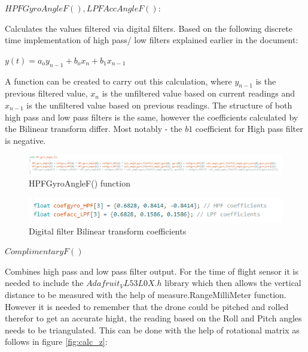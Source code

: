 $HPFGyroAngleF(), LPFAccAngleF():$\newline

Calculates the values filtered via digital filters. Based on the following discrete time implementation of high pass/ low filters explained earlier in the document:

$y(t)=a_o y_{n-1}+b_ox_n+b_1x_{n-1}  $


A function can be created to carry out this calculation, where $y_{n-1}$ is the previous filtered value, $x_n$ is the unfiltered value based on current readings and $x_{n-1}$ is the unfiltered value based on previous readings. The structure of both high pass and low pass filters is the same, however the coefficients calculated by the Bilinear transform differ. Most notably - the 
$b1$ coefficient for High pass filter is negative.

\begin{figure}[H]
    \begin{center}
    \includegraphics[scale = 0.85]{pictures/IMU/HPF_gyro.png}
    \end{center}
    \caption{HPFGyroAngleF() function}
    \label{fig:my_label}
\end{figure}

\begin{figure}[H]
    \begin{center}
    \includegraphics[scale = 0.85]{pictures/IMU/HPF_LPF_coefff.png}
    \end{center}
    \caption{Digital filter Bilinear transform coefficients}
    \label{fig:my_label}
\end{figure}


$ComplimentaryF()$
\newline

Combines high pass and low pass filter output.
For the time of flight sensor it is needed to include the $Adafruit_VL53L0X.h$ library \cite{VL53L0XV2} which then allows the vertical distance to be measured with the help of measure.RangeMilliMeter function.
However it is needed to remember that the drone could be pitched and rolled therefor to get an accurate hight, the reading based on the Roll and Pitch angles needs to be triangulated.
This can be done with the help of rotational matrix as follows in figure \ref{fig:calc_z}:


